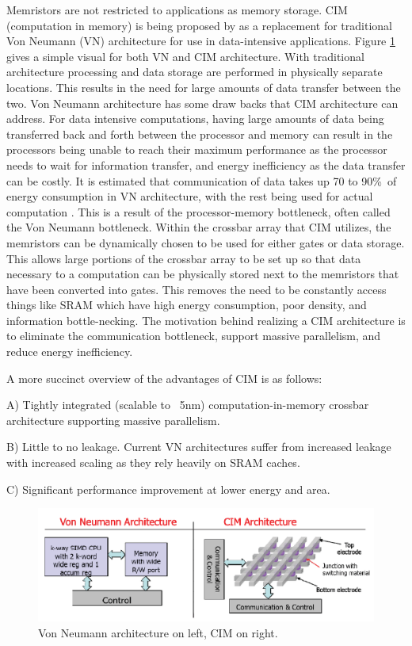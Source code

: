 \documentclass{sig-alternate}
\begin{document}
Memristors are not restricted to applications as memory storage.  CIM (computation in memory) is being proposed by \cite{Hamdioui:2015:MBC:2755753.2757210} as a replacement for traditional Von Neumann (VN) architecture for use in data-intensive applications.  Figure \ref{fig:crossbar} gives a simple visual for both VN and CIM architecture.  With traditional architecture processing and data storage are performed in physically separate locations.  This results in the need for large amounts of data transfer between the two.  Von Neumann architecture has some draw backs that CIM architecture can address.  For data intensive computations, having large amounts of data being transferred back and forth between the processor and memory can result in the processors being unable to reach their maximum performance as the processor needs to wait for information transfer, and energy inefficiency as the data transfer can be costly.  It is estimated that communication of data takes up 70 to 90\%\ of energy consumption in VN architecture, with the rest being used for actual computation \cite{Hamdioui:2015:MBC:2755753.2757210}. This is a result of the processor-memory bottleneck, often called the Von Neumann bottleneck.  Within the crossbar array that CIM utilizes, the memristors can be dynamically chosen to be used for either gates or data storage.  This allows large portions of the crossbar array to be set up so that data necessary to a computation can be physically stored next to the memristors that have been converted into gates.  This removes the need to be constantly access things like SRAM which have high energy consumption, poor density, and information bottle-necking.  The motivation behind realizing a CIM architecture is to eliminate the communication bottleneck, support massive parallelism, and reduce energy inefficiency.  

A more succinct overview of the advantages of CIM is as follows:

A) Tightly integrated (scalable to ~5nm) computation-in-memory crossbar
architecture supporting massive parallelism.

B) Little to no leakage.  Current VN architectures suffer from increased leakage with increased scaling as they rely heavily on SRAM caches.

C) Significant performance improvement at lower energy
and area.
\begin{figure}[h!]
  \includegraphics[width=\linewidth]{crossbarexmp.png}
  \caption{Von Neumann architecture on left, CIM on right.}
  \label{fig:crossbar}
\end{figure}
\end{document}
